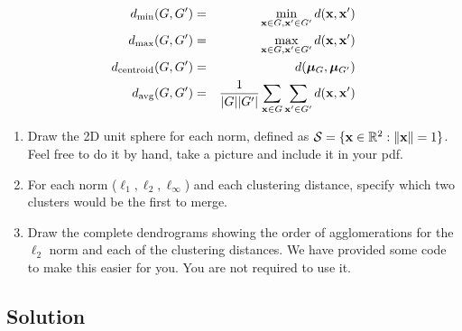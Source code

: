 \documentclass[submit]{harvardml}
\begin{document}
\begin{problem}
\begin{eqnarray*}
    d_{\text{min}}(G, G') &=& \min_{\mathbf{x}  \in G, \mathbf{x}' \in G'} d(\mathbf{x}, \mathbf{x}')\\
    d_{\text{max}}(G, G') &=& \max_{\mathbf{x}  \in G, \mathbf{x}' \in G'} d(\mathbf{x}, \mathbf{x}')\\
    d_{\text{centroid}}(G, G') &=&  d(\boldsymbol{\mu}_{G}, \boldsymbol{\mu}_{G'})\\
    d_{\text{avg}}(G, G') &=&\frac{1}{|G| |G'|} \sum_{\mathbf{x} \in G}\sum_{\mathbf{x}'  \in G'} d(\mathbf{x}, \mathbf{x}')\\
  \end{eqnarray*}

  \begin{enumerate}
  \item Draw the 2D unit sphere for each norm,
  defined as $\mathcal{S} = \{\mathbf{x} \in \mathbb{R}^2: \|\mathbf{x}\| = 1 \}$. Feel free to do
  it by hand, take a picture and include it in your pdf.
\item  For each norm ($\ell_1, \ell_2, \ell_\infty$) and each clustering distance, specify which two clusters would
  be the first to merge.
\item Draw the complete dendrograms showing the order of agglomerations for the $\ell_2$ norm and each of the clustering distances. We have provided some code to make this easier for you. You are not required to use it.
  \end{enumerate}


\end{problem}

\subsection*{Solution}

\newpage 
\end{document}
